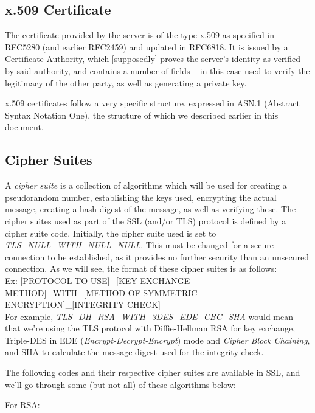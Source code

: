 \subsection{x.509 Certificate}
The certificate\cite{rfcServerCertificate} provided by the server is of the type x.509 as specified in RFC5280 (and earlier RFC2459) and updated in RFC6818. It is issued by a Certificate Authority, which [supposedly] proves the server's identity as verified by said authority, and contains a number of fields -- in this case used to verify the legitimacy of the other party, as well as generating a private key.

x.509 certificates follow a very specific structure\cite{rfcX509certificateStructure}, expressed in ASN.1 (Abstract Syntax Notation One), the structure of which we described earlier in this document.

\subsection{Cipher Suites}
A \textit{cipher suite} is a collection of algorithms which will be used for creating a pseudorandom number, establishing the keys used, encrypting the actual message, creating a hash digest of the message, as well as verifying these. The cipher suites used as part of the SSL (and/or TLS) protocol is defined by a cipher suite code. Initially, the cipher suite used is set to \textit{TLS\_NULL\_WITH\_NULL\_NULL}. This must be changed for a secure connection to be established, as it provides no further security than an unsecured connection. As we will see, the format of these cipher suites is as follows: \\
Ex: [PROTOCOL TO USE]\_[KEY EXCHANGE METHOD]\_WITH\_[METHOD OF SYMMETRIC ENCRYPTION]\_[INTEGRITY CHECK] \\
For example, \textit{TLS\_DH\_RSA\_WITH\_3DES\_EDE\_CBC\_SHA} would mean that we're using the TLS protocol with Diffie-Hellman RSA for key exchange, Triple-DES in EDE (\textit{Encrypt-Decrypt-Encrypt}) mode and \textit{Cipher Block Chaining}, and SHA to calculate the message digest used for the integrity check.

The following codes and their respective cipher suites are available in SSL, and we'll go through some (but not all) of these algorithms below\cite{rfcCipherSuiteList,rfcSSLCipherSuiteList}:

For RSA:

